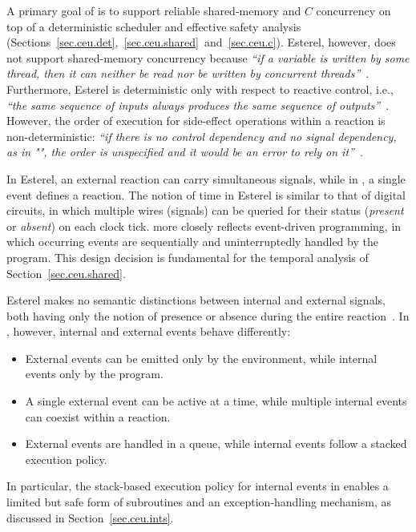 A primary goal of \CEU is to support reliable shared-memory and $C$ concurrency 
on top of a deterministic scheduler and effective safety analysis
(Sections~\ref{sec.ceu.det},~\ref{sec.ceu.shared}~and~\ref{sec.ceu.c}).
%
Esterel, however, does not support shared-memory concurrency because \emph{``if 
a variable is written by some thread, then it can neither be read nor be 
written by concurrent threads''}~\cite{esterel.primer}.
%
Furthermore, Esterel is deterministic only with respect to reactive control, 
i.e., \emph{``the same sequence of inputs always produces the same sequence of 
outputs''}~\cite{esterel.primer}.
However, the order of execution for side-effect operations within a reaction is 
non-deterministic: \emph{``if there is no control dependency and no signal 
dependency, as in "", the order is unspecified and 
it would be an error to rely on it''}~\cite{esterel.primer}.
%

In Esterel, an external reaction can carry simultaneous signals, while in \CEU, 
a single event defines a reaction.
%
The notion of time in Esterel is similar to that of digital circuits, in which 
multiple wires (signals) can be queried for their status (\emph{present} or 
\emph{absent}) on each clock tick.
%
\CEU more closely reflects event-driven programming, in which occurring events 
are sequentially and uninterruptedly handled by the program.
%
This design decision is fundamental for the temporal analysis of 
Section~\ref{sec.ceu.shared}.%

Esterel makes no semantic distinctions between internal and external signals, 
both having only the notion of presence or absence during the entire 
reaction~\cite{esterel.preemption}.
%
In \CEU, however, internal and external events behave differently:
%
\begin{itemize}
\item External events can be emitted only by the environment, while internal 
events only by the program.
\item A single external event can be active at a time, while multiple internal 
events can coexist within a reaction.
\item External events are handled in a queue, while internal events follow a 
stacked execution policy.
\end{itemize}
%
In particular, the stack-based execution policy for internal events in \CEU 
enables a limited but safe form of subroutines and an exception-handling 
mechanism, as discussed in Section~\ref{sec.ceu.ints}.

